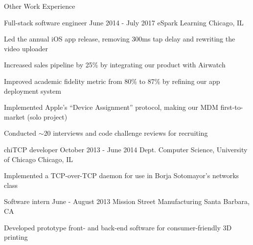 \documentclass{resume} %
\begin{document}
\begin{rSection}{Other Work Experience}

\begin{rSubsection}{Full-stack software engineer}{ June 2014 - July 2017}{ eSpark Learning}{ Chicago, IL}
\item Led the annual iOS app release, removing 300ms tap delay and rewriting the video uploader
\item Increased sales pipeline by 25\% by integrating our product with Airwatch
\item Improved academic fidelity metric from 80\% to 87\% by refining our app deployment system
\item Implemented Apple's ``Device Assignment'' protocol, making our MDM first-to-market (solo project)
\item Conducted $\sim$20 interviews and code challenge reviews for recruiting
\end{rSubsection}

\begin{rSubsection}{ chiTCP developer}{ October 2013 - June 2014}{ Dept. Computer Science, University of Chicago}{ Chicago, IL}
\item Implemented a TCP-over-TCP daemon for use in Borja Sotomayor's networks class
\end{rSubsection}

\begin{rSubsection}{ Software intern}{ June - August 2013}{ Mission Street Manufacturing}{ Santa Barbara, CA}
\item Developed prototype front- and back-end software for consumer-friendly 3D printing
\end{rSubsection}

\end{rSection}
\end{document}
